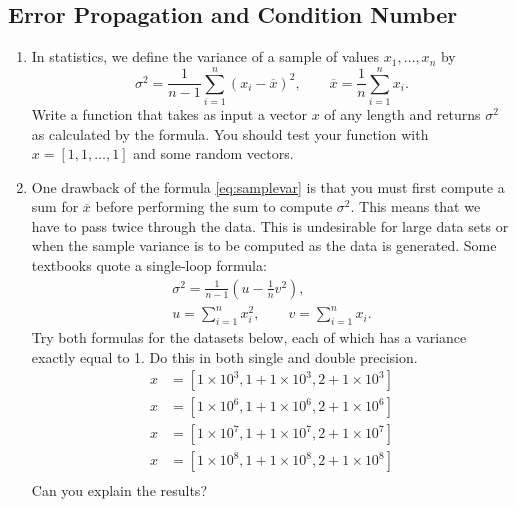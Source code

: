 \subsection{Error Propagation and Condition Number}

\begin{exercise}
	\begin{enumerate}
		\item In statistics, we define the variance of a sample of values
		      $x_1,\ldots,x_n$ by
		      \begin{equation}\label{eq:samplevar}
			      \sigma^2 = \frac{1}{n-1} \sum_{i=1}^n (x_{i} - \overline{x})^{2},
			      \qquad
			      \overline{x} = \frac{1}{n} \sum_{i=1}^n x_i.
		      \end{equation}
		      Write a function that takes as input a vector $x$ of any length and
		      returns $\sigma^2$ as calculated by the formula. You should test your function
		      with $x=[1,1,\ldots,1]$ and some random vectors.
		\item One drawback of the formula \eqref{eq:samplevar} is that you must
		      first compute a sum for $\overline{x}$ before performing the sum to compute
		      $\sigma^2$. This means that we have to pass twice through the data. This is
		      undesirable for large data sets or when the sample variance is to be computed as
		      the data is generated. Some textbooks quote a single-loop formula:
		      \[
			      \begin{split}
				      \sigma^2 = \frac{1}{n-1} \left( u - \tfrac{1}{n}v^2 \right), \\
				      u  = \sum_{i=1}^n x_i^2,
				      \qquad
				      v = \sum_{i=1}^n x_i.
			      \end{split}
		      \]
		      Try both formulas for the datasets below, each of which has a variance
		      exactly equal to 1. Do this in both single and double precision.
		      \begin{align*}
			      x & = [ 1 \times 10^{3}, 1 + 1 \times 10^{3}, 2 + 1 \times 10^{3} ] \\
			      x & = [ 1 \times 10^{6}, 1 + 1 \times 10^{6}, 2 + 1 \times 10^{6} ] \\
			      x & = [ 1 \times 10^{7}, 1 + 1 \times 10^{7}, 2 + 1 \times 10^{7} ] \\
			      x & = [ 1 \times 10^{8}, 1 + 1 \times 10^{8}, 2 + 1 \times 10^{8} ] \\
		      \end{align*}
		      Can you explain the results?
	\end{enumerate}
\end{exercise}

